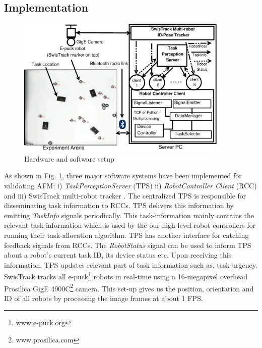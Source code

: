 \documentclass[smallcondensed]{svjour3}
\begin{document}
\subsection{Implementation}
\label{sec:impl}
\begin{figure}
\centering
\includegraphics[width=0.9\textwidth, angle=0]
{./images/RIL-Expt-Setup1.eps}
\caption{\small Hardware and software setup}
\label{fig:setup} %
\end{figure}
As shown in Fig. \ref{fig:setup}, three major software systems have been implemented for validating AFM: i) \textit{TaskPerceptionServer} (TPS) ii) \textit{RobotController Client} (RCC) and iii) SwisTrack multi-robot tracker \citep{Lochmatter+2008}. The centralized TPS is responsible for disseminating task information to RCCs. TPS delivers this information by emitting \textit{TaskInfo} signals periodically. This task-information mainly contains the relevant task information which is used by the our high-level robot-controllers for running their task-allocation algorithm. TPS has another interface for catching feedback signals from RCCs. The \textit{RobotStatus} signal can be used to inform TPS about a robot's current task ID, its device status etc. Upon  receiving this information, TPS updates relevant part of task information such as, task-urgency.  SwisTrack  tracks all e-puck\footnote{www.e-puck.org} robots in real-time using a 16-megapixel overhead Prosilica GigE 4900C\footnote{www.prosilica.com}  camera. This set-up gives us the position, orientation and ID of all  robots by processing the image frames at about 1 FPS.  
\end{document}
